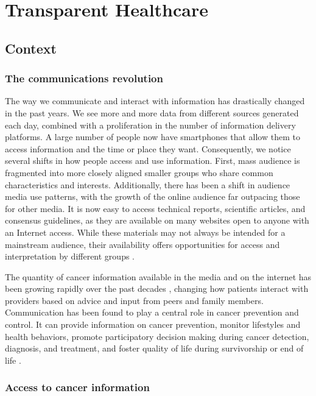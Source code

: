 \chapter{Transparent Healthcare}

\section{Context}

\subsection{The communications revolution}

The way we communicate and interact with information has drastically changed in the past years. We see more and more data from different sources generated each day, combined with a proliferation in the number of information delivery platforms. A large number of people now have smartphones that allow them to access information and the time or place they want. Consequently, we notice several shifts in how people access and use information. First, mass audience is fragmented into more closely aligned smaller groups who share common characteristics and interests. Additionally, there has been a shift in audience media use patterns, with the growth of the online audience far outpacing those for other media. It is now easy to access technical reports, scientific articles, and consensus guidelines, as they are available on many websites open to anyone with an Internet access. While these materials may not always be intended for a mainstream audience, their availability offers opportunities for access and interpretation by different groups \cite{viswanath_communications_2012}.

The quantity of cancer information available in the media and on the internet has been growing rapidly over the past decades \cite{viswanath_science_2005,viswanath_communications_2012}, changing how patients interact with providers based on advice and input from peers and family members. Communication has been found to play a central role in cancer prevention and control. It can provide information on cancer prevention, monitor lifestyles and health behaviors, promote participatory decision making during cancer detection, diagnosis, and treatment, and foster quality of life during survivorship or end of life  \cite{viswanath_communications_2012}.

\subsection{Access to cancer information}

